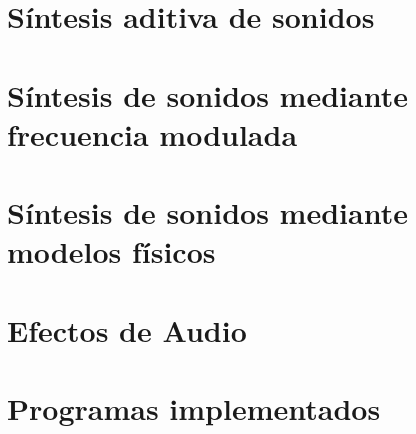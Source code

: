 







\tableofcontents
\newpage


%	
	
\section{Síntesis aditiva de sonidos}
	\label{Ejercicio-2}
	

\section{Síntesis de sonidos mediante frecuencia modulada}
	\label{Ejercicio-3}
	

\section{Síntesis de sonidos mediante modelos físicos}
	\label{Ejercicio-4}
	

%	

\section{Efectos de Audio}
	\label{Ejercicio-6}
	

%	

\section{Programas implementados}
	\label{Ejercicio-8}
	


